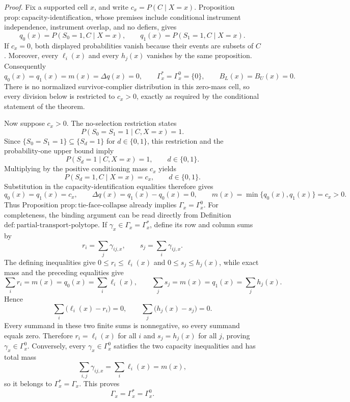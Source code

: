 \noindent\textit{Proof.}
Fix a supported cell \(x\), and write \(c_x=P(C\mid X=x)\).  Proposition \(\mathrm{prop{:}capacity\text{-}identification}\), whose premises include conditional instrument independence, instrument overlap, and no defiers, gives
\[
q_0(x)=P(S_0=1,C\mid X=x),
\qquad
q_1(x)=P(S_1=1,C\mid X=x).
\]
If \(c_x=0\), both displayed probabilities vanish because their events are subsets of \(C\).  Moreover, every \(\ell_i(x)\) and every \(h_j(x)\) vanishes by the same proposition.  Consequently
\[
q_0(x)=q_1(x)=m(x)=\Delta q(x)=0,
\qquad
\Gamma_x^{\ast}=\Gamma_x^{0}=\{0\},
\qquad
B_L(x)=B_U(x)=0.
\]
There is no normalized survivor-complier distribution in this zero-mass cell, so every division below is restricted to \(c_x>0\), exactly as required by the conditional statement of the theorem.

Now suppose \(c_x>0\).  The no-selection restriction states
\[
P(S_0=S_1=1\mid C,X=x)=1.
\]
Since \(\{S_0=S_1=1\}\subseteq\{S_d=1\}\) for \(d\in\{0,1\}\), this restriction and the probability-one upper bound imply
\[
P(S_d=1\mid C,X=x)=1,
\qquad d\in\{0,1\}.
\]
Multiplying by the positive conditioning mass \(c_x\) yields
\[
P(S_d=1,C\mid X=x)=c_x,
\qquad d\in\{0,1\}.
\]
Substitution in the capacity-identification equalities therefore gives
\[
q_0(x)=q_1(x)=c_x,
\qquad
\Delta q(x)=q_1(x)-q_0(x)=0,
\qquad
m(x)=\min\{q_0(x),q_1(x)\}=c_x>0.
\]
Thus Proposition \(\mathrm{prop{:}tie\text{-}face\text{-}collapse}\) already implies \(\Gamma_x=\Gamma_x^{0}\).  For completeness, the binding argument can be read directly from Definition \(\mathrm{def{:}partial\text{-}transport\text{-}polytope}\).  If \(\gamma_x\in\Gamma_x=\Gamma_x^{\ast}\), define its row and column sums by
\[
r_i=\sum_j\gamma_{ij,x},
\qquad
s_j=\sum_i\gamma_{ij,x}.
\]
The defining inequalities give \(0\le r_i\le\ell_i(x)\) and \(0\le s_j\le h_j(x)\), while exact mass and the preceding equalities give
\[
\sum_i r_i=m(x)=q_0(x)=\sum_i\ell_i(x),
\qquad
\sum_j s_j=m(x)=q_1(x)=\sum_jh_j(x).
\]
Hence
\[
\sum_i\bigl(\ell_i(x)-r_i\bigr)=0,
\qquad
\sum_j\bigl(h_j(x)-s_j\bigr)=0.
\]
Every summand in these two finite sums is nonnegative, so every summand equals zero.  Therefore \(r_i=\ell_i(x)\) for all \(i\) and \(s_j=h_j(x)\) for all \(j\), proving \(\gamma_x\in\Gamma_x^{0}\).  Conversely, every \(\gamma_x\in\Gamma_x^{0}\) satisfies the two capacity inequalities and has total mass
\[
\sum_{i,j}\gamma_{ij,x}=\sum_i\ell_i(x)=m(x),
\]
so it belongs to \(\Gamma_x^{\ast}=\Gamma_x\).  This proves
\[
\Gamma_x=\Gamma_x^{\ast}=\Gamma_x^{0}.
\]

